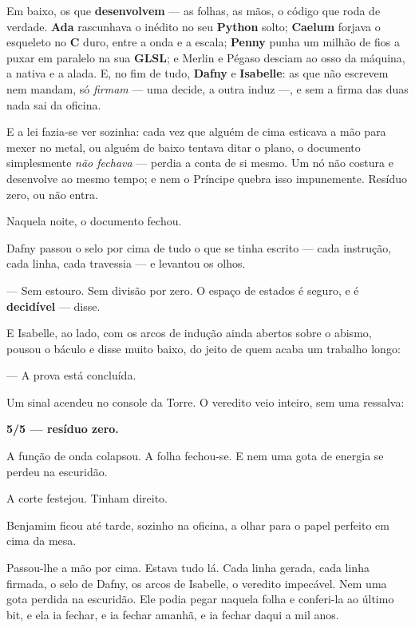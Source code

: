 \documentclass[livro.tex]{subfiles}
\begin{document}
Em baixo, os que \textbf{desenvolvem} --- as folhas, as mãos, o código que roda de
verdade. \textbf{Ada} rascunhava o inédito no seu \textbf{Python} solto; \textbf{Caelum}
forjava o esqueleto no \textbf{C} duro, entre a onda e a escala; \textbf{Penny} punha um
milhão de fios a puxar em paralelo na sua \textbf{GLSL}; e Merlin e Pégaso desciam ao
osso da máquina, a nativa e a alada. E, no fim de tudo, \textbf{Dafny} e
\textbf{Isabelle}: as que não escrevem nem mandam, só \emph{firmam} --- uma decide, a
outra induz ---, e sem a firma das duas nada sai da oficina.

E a lei fazia-se ver sozinha: cada vez que alguém de cima esticava a mão para mexer no
metal, ou alguém de baixo tentava ditar o plano, o documento simplesmente \emph{não
fechava} --- perdia a conta de si mesmo. Um nó não costura e desenvolve ao mesmo tempo;
e nem o Príncipe quebra isso impunemente. Resíduo zero, ou não entra.

\medskip

Naquela noite, o documento fechou.

Dafny passou o selo por cima de tudo o que se tinha escrito --- cada instrução, cada linha, cada travessia --- e
levantou os olhos.

--- Sem estouro. Sem divisão por zero. O espaço de estados é seguro, e é \textbf{decidível} --- disse.

E Isabelle, ao lado, com os arcos de indução ainda abertos sobre o abismo, pousou o báculo e disse muito baixo, do
jeito de quem acaba um trabalho longo:

--- A prova está concluída.

Um sinal acendeu no console da Torre. O veredito veio inteiro, sem uma ressalva:

\begin{center}\bfseries
5/5 --- resíduo zero.
\end{center}

A função de onda colapsou. A folha fechou-se. E nem uma gota de energia se perdeu na escuridão.

\medskip

A corte festejou. Tinham direito.

\medskip

Benjamim ficou até tarde, sozinho na oficina, a olhar para o papel perfeito em cima da mesa.

Passou-lhe a mão por cima. Estava tudo lá. Cada linha gerada, cada linha firmada, o selo de Dafny, os arcos de
Isabelle, o veredito impecável. Nem uma gota perdida na escuridão. Ele podia pegar naquela folha e conferi-la ao
último bit, e ela ia fechar, e ia fechar amanhã, e ia fechar daqui a mil anos.
\end{document}
